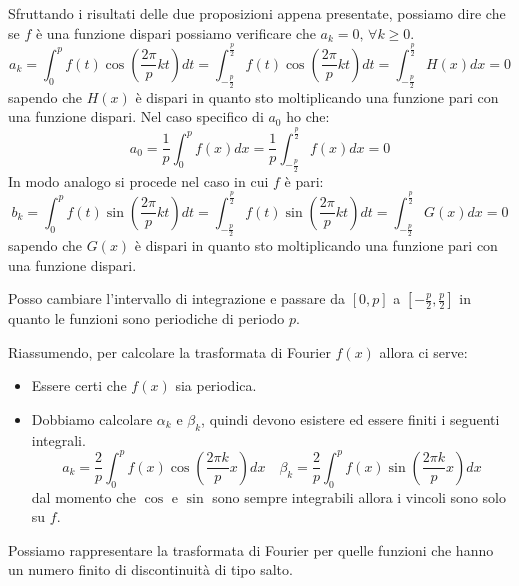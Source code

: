 Sfruttando i risultati delle due proposizioni appena presentate, possiamo dire che
se $f$ è una funzione dispari possiamo verificare che $a_k = 0, \, \forall k \ge 0$.
\begin{equation*}
    a_k = \int_{0}^{p} f(t) \cos\left(\frac{2 \pi}{p} kt\right) dt =
    \int_{-\frac{p}{2}}^{\frac{p}{2}} f(t) \cos\left(\frac{2 \pi}{p} kt\right) dt =
    \int_{-\frac{p}{2}}^{\frac{p}{2}} H(x) dx = 0
\end{equation*}
sapendo che $H(x)$ è dispari in quanto sto moltiplicando una funzione pari con una
funzione dispari. Nel caso specifico di $a_0$ ho che:
\begin{equation*}
    a_0 =\frac{1}{p} \int_{0}^{p}f(x)dx = \frac{1}{p} \int_{-\frac{p}{2}}^{\frac{p}{2}}f(x)dx = 0
\end{equation*}
In modo analogo si procede nel caso in cui $f$ è pari:
\begin{equation*}
    b_k = \int_{0}^{p} f(t) \sin\left(\frac{2 \pi}{p} kt\right) dt =
    \int_{-\frac{p}{2}}^{\frac{p}{2}} f(t) \sin\left(\frac{2 \pi}{p} kt\right) dt =
    \int_{-\frac{p}{2}}^{\frac{p}{2}} G(x) dx = 0
\end{equation*}
sapendo che $G(x)$ è dispari in quanto sto moltiplicando una funzione pari con una
funzione dispari.
\begin{nota}
    Posso cambiare l'intervallo di integrazione e passare da $[0,p]$ a $[-\frac{p}{2},\frac{p}{2}]$
    in quanto le funzioni sono periodiche di periodo $p$.
\end{nota}

Riassumendo, per calcolare la trasformata di Fourier $f(x)$ allora ci serve:
\begin{itemize}
    \item Essere certi che $f(x)$ sia periodica.
    \item Dobbiamo calcolare $\alpha_k$ e $\beta_k$, quindi devono esistere
          ed essere finiti i seguenti integrali.
          \begin{equation*}
              a_k = \frac{2}{p}\int_{0}^{p}f(x)\cos\left(\frac{2\pi k}{p}x\right)
              dx \quad \beta_k=\frac{2}{p}\int_{0}^{p}f(x)\sin\left(\frac{2\pi k}{p}x\right)dx
          \end{equation*}
          dal momento che $\cos$ e $\sin$ sono sempre integrabili allora i vincoli
          sono solo su $f$.
\end{itemize}
\begin{nota}
    Possiamo rappresentare la trasformata di Fourier per quelle funzioni che hanno
    un numero finito di discontinuità di tipo salto.
\end{nota}

